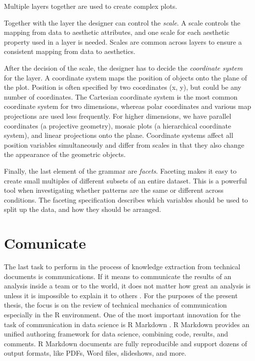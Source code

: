 \documentclass[b5paper,]{book}
\theoremstyle{definition}
\theoremstyle{definition}
\theoremstyle{definition}
\theoremstyle{remark}
\begin{document}
Multiple layers together are used to create complex plots.

Together with the layer the designer can control the \emph{scale}. A
scale controls the mapping from data to aesthetic attributes, and one
scale for each aesthetic property used in a layer is needed. Scales are
common across layers to ensure a consistent mapping from data to
aesthetics.

After the decision of the scale, the designer has to decide the
\emph{coordinate system} for the layer. A coordinate system maps the
position of objects onto the plane of the plot. Position is often
specified by two coordinates (x, y), but could be any number of
coordinates. The Cartesian coordinate system is the most common
coordinate system for two dimensions, whereas polar coordinates and
various map projections are used less frequently. For higher dimensions,
we have parallel coordinates (a projective geometry), mosaic plots (a
hierarchical coordinate system), and linear projections onto the plane.
Coordinate systems affect all position variables simultaneously and
differ from scales in that they also change the appearance of the
geometric objects.

Finally, the last element of the grammar are \emph{facets}. Faceting
makes it easy to create small multiples of different subsets of an
entire dataset. This is a powerful tool when investigating whether
patterns are the same or different across conditions. The faceting
specification describes which variables should be used to split up the
data, and how they should be arranged.

\section{Comunicate}\label{sotatoolscomunicate}

The last task to perform in the process of knowledge extraction from
technical documents is communications. If it means to communicate the
results of an analysis inside a team or to the world, it does not matter
how great an analysis is unless it is impossible to explain it to others
\citep{wickham2016r}. For the purposes of the present thesis, the focus
is on the review of technical mechanics of communication especially in
the R \citep{R-base} environment. One of the most important innovation
for the task of communication in data science is R Markdown
\citep{R-rmarkdown}. R Markdown provides an unified authoring framework
for data science, combining code, results, and comments. R Markdown
documents are fully reproducible and support dozens of output formats,
like PDFs, Word files, slideshows, and more.
\end{document}
